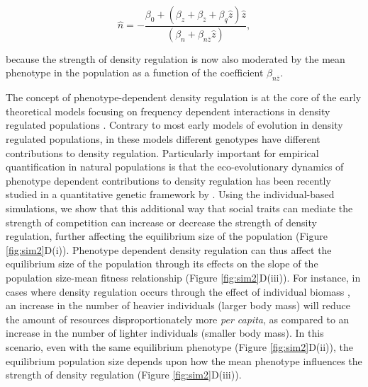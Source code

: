 \documentclass{article}
\begin{document}
\begin{equation}
\hat{n} = -\frac{\beta_{0}+(\beta_{z}  + \beta_{\bar{z}} + \beta_{q}\hat{z})\hat{z}}{(\beta_{n} +  \beta_{n\bar{z}} \hat{z})},
\end{equation}

\noindent because the strength of density regulation is now also moderated by the mean phenotype in the population as a function of the coefficient  $\beta_{n\bar{z}}$. 

The concept of phenotype-dependent density regulation is at the core of the early theoretical models focusing on frequency dependent interactions in density regulated populations \citep{Clarke1972, Anderson1983}. Contrary to most early models of evolution in density regulated populations, in these models different genotypes have different contributions to density regulation. Particularly important for empirical quantification in natural populations is that the eco-evolutionary dynamics of phenotype dependent contributions to density regulation has been recently studied in a quantitative genetic framework by \cite{Engen2020}. Using the individual-based simulations, we show that this additional way that social traits can mediate the strength of competition can increase or decrease the strength of density regulation, further affecting the equilibrium size of the population (Figure \ref{fig:sim2}D(i)). Phenotype dependent density regulation can thus affect the equilibrium size of the population through its effects on the slope of the population size-mean fitness relationship (Figure \ref{fig:sim2}D(iii)). For instance, in cases where density regulation occurs through the effect of individual biomass \citep{Owen-Smith2002}, an increase in the number of heavier individuals (larger body mass) will reduce the amount of resources disproportionately more \textit{per capita}, as compared to an increase in the number of lighter individuals (smaller body mass). In this scenario, even with the same equilibrium phenotype (Figure \ref{fig:sim2}D(ii)), the equilibrium population size depends upon how the mean phenotype influences the strength of density regulation (Figure \ref{fig:sim2}D(iii)). 
\end{document}

